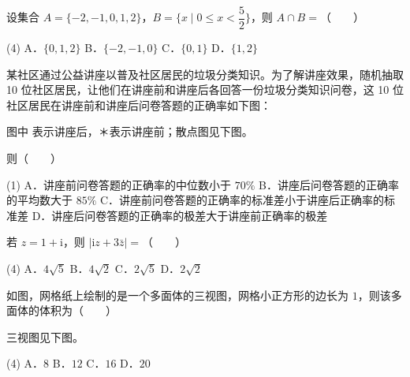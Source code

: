 


\begin{question}
设集合 $A=\{-2,-1,0,1,2\}$，$B=\{x\mid 0\leq x<\dfrac52\}$，则 $A\cap B=$\mbox{（　　）}

\begin{gkopts}(4)
\task A．$\{0,1,2\}$
\task B．$\{-2,-1,0\}$
\task C．$\{0,1\}$
\task D．$\{1,2\}$
\end{gkopts}

\Needspace{0.4\textheight}
\end{question}
\begin{question}
某社区通过公益讲座以普及社区居民的垃圾分类知识。为了解讲座效果，随机抽取 10 位社区居民，让他们在讲座前和讲座后各回答一份垃圾分类知识问卷，这 10 位社区居民在讲座前和讲座后问卷答题的正确率如下图：

图中 \textbullet{} 表示讲座后，＊表示讲座前；散点图见下图。
\nopagebreak[4]
\begin{center}\end{center}
\nopagebreak[4]
则\mbox{（　　）}

\begin{gkopts}(1)
\task A．讲座前问卷答题的正确率的中位数小于 $70\%$
\task B．讲座后问卷答题的正确率的平均数大于 $85\%$
\task C．讲座前问卷答题的正确率的标准差小于讲座后正确率的标准差
\task D．讲座后问卷答题的正确率的极差大于讲座前正确率的极差
\end{gkopts}

\end{question}
\begin{question}
若 $z=1+\mathrm i$，则 $\left|\mathrm iz+3\bar z\right|=$\mbox{（　　）}

\begin{gkopts}(4)
\task A．$4\sqrt5$
\task B．$4\sqrt2$
\task C．$2\sqrt5$
\task D．$2\sqrt2$
\end{gkopts}

\Needspace{0.4\textheight}
\end{question}
\begin{question}
如图，网格纸上绘制的是一个多面体的三视图，网格小正方形的边长为 $1$，则该多面体的体积为\mbox{（　　）}

三视图见下图。
\nopagebreak[4]
\begin{center}\end{center}
\nopagebreak[4]
\begin{gkopts}(4)
\task A．$8$
\task B．$12$
\task C．$16$
\task D．$20$
\end{gkopts}

\end{question}
